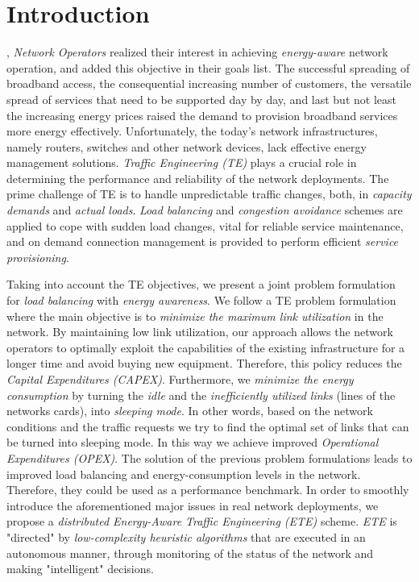 \documentclass[journal]{IEEEtran}
\begin{document}
\section{Introduction}
, \emph{Network Operators} realized their interest in achieving \emph{energy-aware} network operation, and added this objective in their goals list. The successful spreading of broadband access, the consequential increasing number of customers, the versatile spread of services that need to be supported day by day, and last but not least the increasing energy prices raised the demand to provision broadband services more energy effectively. Unfortunately, the today's network infrastructures, namely routers, switches and other network devices, lack effective energy management solutions. \emph{Traffic Engineering (TE)} plays a crucial role in determining the performance and reliability of the network deployments. The prime challenge of TE is to handle unpredictable traffic changes, both, in \emph{capacity demands} and \emph{actual loads}. \emph{Load balancing} and \emph{congestion avoidance} schemes are applied to cope with sudden load changes, vital for reliable service maintenance, and on demand connection management is provided to perform efficient \emph{service provisioning}.

Taking into account the TE objectives, we present a joint problem formulation for \emph{load balancing} with \emph{energy awareness}. We follow a TE problem formulation where the main objective is to \emph{minimize the maximum link utilization} in the network. By maintaining low link utilization, our approach allows the network operators to optimally exploit the capabilities of the existing infrastructure for a longer time and avoid buying new equipment. Therefore, this policy reduces the \emph{Capital Expenditures (CAPEX)}. Furthermore, we \emph{minimize the energy consumption} by turning the \emph{idle} and the \emph{inefficiently utilized links} (lines of the networks cards), into \emph{sleeping mode}. In other words, based on the network conditions and the traffic requests we try to find the optimal set of links that can be turned into sleeping mode. In this way we achieve improved \emph{Operational Expenditures (OPEX)}. The solution of the previous problem formulations leads to improved load balancing and energy-consumption levels in the network. Therefore, they could be used as a performance benchmark. In order to smoothly introduce the aforementioned major issues in real network deployments, we propose a \emph{distributed Energy-Aware Traffic Engineering (ETE)} scheme. \emph{ETE} is "directed" by \emph{low-complexity heuristic algorithms} that are executed in an autonomous manner, through monitoring of the status of the network and making "intelligent" decisions.
\end{document}
